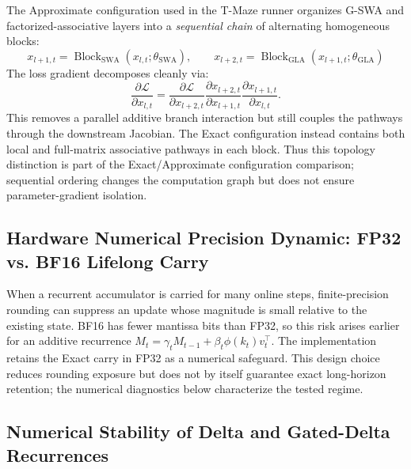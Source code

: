 The Approximate configuration used in the T-Maze runner organizes G-SWA and factorized-associative layers into a \textit{sequential chain} of alternating homogeneous blocks:
\begin{equation}
    x_{l+1,t}=\operatorname{Block}_{\mathrm{SWA}}(x_{l,t};\theta_{\mathrm{SWA}}),\qquad
    x_{l+2,t}=\operatorname{Block}_{\mathrm{GLA}}(x_{l+1,t};\theta_{\mathrm{GLA}})
\end{equation}
The loss gradient decomposes cleanly via:
\begin{equation}
    \frac{\partial \mathcal{L}}{\partial x_{l,t}}=\frac{\partial \mathcal{L}}{\partial x_{l+2,t}}\frac{\partial x_{l+2,t}}{\partial x_{l+1,t}}\frac{\partial x_{l+1,t}}{\partial x_{l,t}}.
\end{equation}
This removes a parallel additive branch interaction but still couples the pathways through the downstream Jacobian. The Exact configuration instead contains both local and full-matrix associative pathways in each block. Thus this topology distinction is part of the Exact/Approximate configuration comparison; sequential ordering changes the computation graph but does not ensure parameter-gradient isolation.

\subsection{Hardware Numerical Precision Dynamic: FP32 vs. BF16 Lifelong Carry}
\label{app:fp32_precision}
When a recurrent accumulator is carried for many online steps, finite-precision rounding can suppress an update whose magnitude is small relative to the existing state. BF16 has fewer mantissa bits than FP32, so this risk arises earlier for an additive recurrence $M_t = \gamma_t M_{t-1} + \beta_t \phi(k_t) v_t^\top$. The implementation retains the Exact carry in FP32 as a numerical safeguard. This design choice reduces rounding exposure but does not by itself guarantee exact long-horizon retention; the numerical diagnostics below characterize the tested regime.

\subsection{Numerical Stability of Delta and Gated-Delta Recurrences}
\label{sec:key_norm_stabilization}

